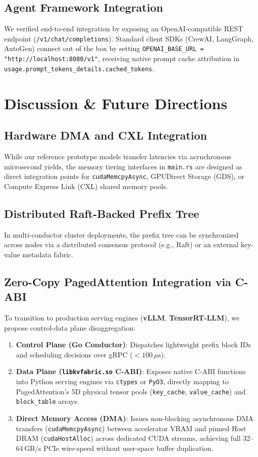\documentclass[10pt,twocolumn,letterpaper]{article}
\begin{document}
\subsection{Agent Framework Integration}
We verified end-to-end integration by exposing an OpenAI-compatible REST endpoint (\texttt{/v1/chat/completions}). Standard client SDKs (CrewAI, LangGraph, AutoGen) connect out of the box by setting \texttt{OPENAI\_BASE\_URL = "http://localhost:8080/v1"}, receiving native prompt cache attribution in \texttt{usage.prompt\_tokens\_details.cached\_tokens}.

\section{Discussion \& Future Directions}

\subsection{Hardware DMA and CXL Integration}
While our reference prototype models transfer latencies via asynchronous microsecond yields, the memory tiering interfaces in \texttt{main.rs} are designed as direct integration points for \texttt{cudaMemcpyAsync}, GPUDirect Storage (GDS), or Compute Express Link (CXL) shared memory pools.

\subsection{Distributed Raft-Backed Prefix Tree}
In multi-conductor cluster deployments, the prefix tree can be synchronized across nodes via a distributed consensus protocol (e.g., Raft) or an external key-value metadata fabric.

\subsection{Zero-Copy PagedAttention Integration via C-ABI}
To transition to production serving engines (\textbf{vLLM}, \textbf{TensorRT-LLM}), we propose control-data plane disaggregation:
\begin{enumerate}
    \item \textbf{Control Plane (Go Conductor)}: Dispatches lightweight prefix block IDs and scheduling decisions over gRPC ($< 100\,\mu\text{s}$).
    \item \textbf{Data Plane (\texttt{libkvfabric.so} C-ABI)}: Exposes native C-ABI functions into Python serving engines via \texttt{ctypes} or \texttt{PyO3}, directly mapping to PagedAttention's 5D physical tensor pools (\texttt{key\_cache}, \texttt{value\_cache}) and \texttt{block\_table} arrays.
    \item \textbf{Direct Memory Access (DMA)}: Issues non-blocking asynchronous DMA transfers (\texttt{cudaMemcpyAsync}) between accelerator VRAM and pinned Host DRAM (\texttt{cudaHostAlloc}) across dedicated CUDA streams, achieving full 32--64\,GB/s PCIe wire-speed without user-space buffer duplication.
\end{enumerate}
\end{document}
